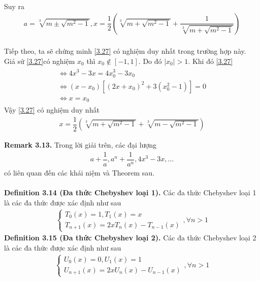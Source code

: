 \documentclass[a4paper,oneside]{book}
\numberwithin{equation}{chapter}
\begin{document}
{\begin{enumerate}
Suy ra
\begin{align}
a = \sqrt[3]{{m \pm \sqrt {{m^2} - 1} }},x = \dfrac{1}{2}\left( {\sqrt[3]{{m + \sqrt {{m^2} - 1} }} + \dfrac{1}{{\sqrt[3]{{m + \sqrt {{m^2} - 1} }}}}} \right)
\end{align}\\
Tiếp theo, ta sẽ chứng minh \eqref{3.27} có nghiệm duy nhất trong trường hợp này.\\
Giả sử \eqref{3.27}có nghiệm ${x_0}$ thì ${x_0} \notin \left[ { - 1,1} \right]$. Do đó $\left| {{x_0}} \right| > 1$. Khi đó \eqref{3.27}
\begin{align}
\begin{array}{l}
 \Leftrightarrow 4{x^3} - 3x = 4x_0^3 - 3{x_0}\\
 \Leftrightarrow \left( {x - {x_0}} \right)\left[ {{{\left( {2x + {x_0}} \right)}^2} + 3\left( {x_0^2 - 1} \right)} \right] = 0\\
 \Leftrightarrow x = {x_0}
\end{array}
\end{align}
Vậy \eqref{3.27} có nghiệm duy nhất 
\begin{align}
x = \dfrac{1}{2}\left( {\sqrt[3]{{m + \sqrt {{m^2} - 1} }} + \sqrt[3]{{m - \sqrt {{m^2} - 1} }}} \right)
\end{align}
\end{enumerate}
\textbf{Remark 3.13.} Trong lời giải trên, các đại lượng 
\begin{align}
a + \dfrac{1}{a},{a^n} + \dfrac{1}{{{a^n}}},4{x^3} - 3x,\ldots
\end{align}
có liên quan đến các khái niệm và Theorem sau.\\
\\
\textbf{Definition 3.14 (Đa thức Chebyshev loại 1).} Các đa thức Chebyshev loại 1 là các đa thức được xác định như sau
\begin{align}
 \left\{ {\begin{array}{*{20}{c}}
{{T_0}\left( x \right) = 1,{T_1}\left( x \right) = x}\\
{{T_{n + 1}}\left( x \right) = 2x{T_n}\left( x \right) - {T_{n - 1}}\left( x \right)}
\end{array}} \right.,\forall n > 1
\end{align}
\textbf{Definition 3.15 (Đa thức Chebyshev loại 2).} Các đa thức Chebyshev loại 2 là các đa thức được xác định như sau
\begin{align}
\left\{ {\begin{array}{*{20}{c}}
{{U_0}\left( x \right) = 0,{U_1}\left( x \right) = 1}\\
{{U_{n + 1}}\left( x \right) = 2x{U_n}\left( x \right) - {U_{n - 1}}\left( x \right)}
\end{array}} \right.,\forall n > 1
\end{align}

}
\end{document}
